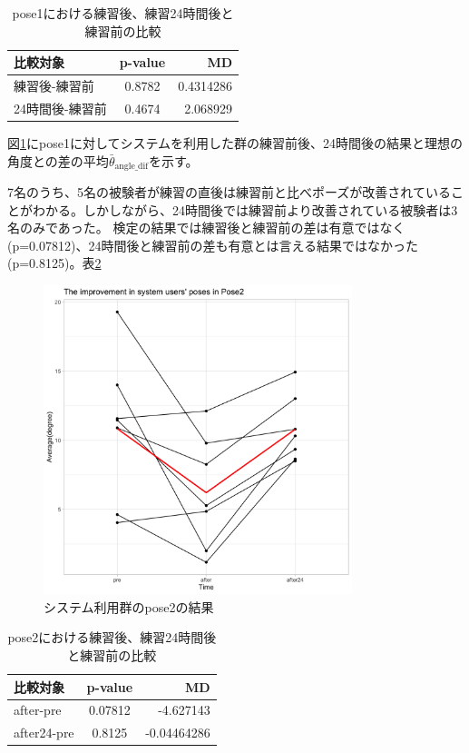       \begin{table}[h]
        \centering
        \caption{pose1における練習後、練習24時間後と練習前の比較}
        \begin{tabular}{lcr}
        \hline
        \textbf{比較対象} & \textbf{p-value} & \textbf{MD} \\ \hline
        練習後-練習前 & 0.8782 & 0.4314286 \\ \hline
        24時間後-練習前 & 0.4674 & 2.068929 \\ \hline
        \end{tabular}
        \label{table:pose1_system_p_value}
        \end{table}

        図\ref{fig:pose2_system}にpose1に対してシステムを利用した群の練習前後、24時間後の結果と理想の角度との差の平均\(\bar{\theta}_{\text{angle\_dif}}\)を示す。


      7名のうち、5名の被験者が練習の直後は練習前と比べポーズが改善されていることがわかる。しかしながら、24時間後では練習前より改善されている被験者は3名のみであった。
      検定の結果では練習後と練習前の差は有意ではなく(p=0.07812)、24時間後と練習前の差も有意とは言える結果ではなかった(p=0.8125)。表\ref{table:pose2_system_p_value}
      \begin{figure}[H]
        \begin{center}
        \includegraphics[width=9cm]{figures/pose2_system_true_graph.png}
        \caption{システム利用群のpose2の結果}
        \label{fig:pose2_system}
        \end{center}
      \end{figure}

      \begin{table}[ht]
        \centering
        \caption{pose2における練習後、練習24時間後と練習前の比較}
        \begin{tabular}{lcr}
        \hline
        \textbf{比較対象} & \textbf{p-value} & \textbf{MD} \\ \hline
        after-pre & 0.07812 & -4.627143 \\ \hline
        after24-pre & 0.8125 & -0.04464286 \\ \hline
        \end{tabular}
        \label{table:pose2_system_p_value}
        \end{table}
